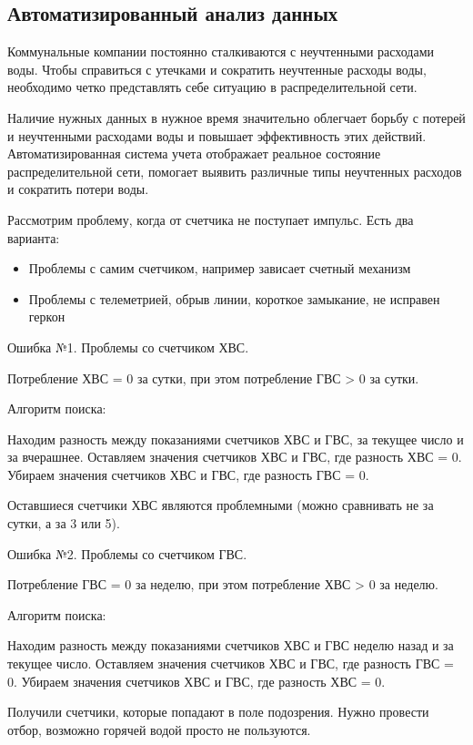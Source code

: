 \subsection{Автоматизированный анализ данных}

Коммунальные компании постоянно сталкиваются с неучтенными расходами воды.
Чтобы справиться с утечками и сократить неучтенные расходы воды, необходимо четко представлять себе ситуацию в распределительной сети. \cite{smartcity}

Наличие нужных данных в нужное время значительно облегчает борьбу с потерей и неучтенными расходами воды и повышает эффективность этих действий. Автоматизированная система учета отображает реальное состояние распределительной сети, помогает выявить различные типы неучтенных расходов и сократить потери воды. 

Рассмотрим проблему, когда от счетчика не поступает импульс. Есть два варианта:
\begin{itemize}
	\item Проблемы с самим счетчиком, например зависает счетный механизм
	\item Проблемы с телеметрией, обрыв линии, короткое замыкание, не исправен геркон
\end{itemize}

Ошибка №1. Проблемы со счетчиком ХВС. 

Потребление ХВС = 0 за сутки, при этом потребление ГВС > 0 за сутки.

Алгоритм поиска:

Находим разность между показаниями счетчиков ХВС и ГВС, за текущее число и за вчерашнее.
Оставляем значения счетчиков ХВС и ГВС, где разность ХВС = 0.
Убираем значения счетчиков ХВС и ГВС, где разность ГВС = 0.

Оставшиеся счетчики ХВС являются проблемными (можно сравнивать не за сутки, а за 3 или 5).

Ошибка №2. Проблемы со счетчиком ГВС.

Потребление ГВС = 0 за неделю, при этом потребление ХВС > 0 за неделю.

Алгоритм поиска:

Находим разность между показаниями счетчиков ХВС и ГВС неделю назад и за текущее число.
Оставляем значения счетчиков ХВС и ГВС, где разность ГВС = 0.
Убираем значения счетчиков ХВС и ГВС, где разность ХВС = 0.

Получили счетчики, которые попадают в поле подозрения.
Нужно провести отбор, возможно горячей водой просто не пользуются.

